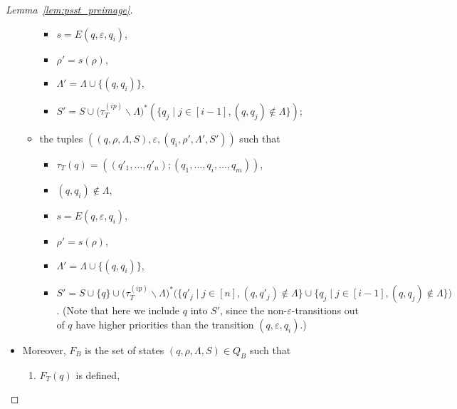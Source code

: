 \begin{proof}[Lemma~\ref{lem:psst_preimage}]
\begin{itemize}
\begin{itemize}
\begin{itemize}
\item $s = E(q, \varepsilon, q_i)$, 
%
\item $\rho' = s(\rho)$,
%
\item $\Lambda' = \Lambda \cup \{(q, q_i)\}$, 
%
\item $S' =  S \cup \big(\tau^{(ip)}_T \backslash \Lambda \big)^\ast(\{ q_j \mid j \in [i-1], (q, q_j) \not \in \Lambda \})$;
%
\end{itemize}
%

\item the tuples $((q, \rho, \Lambda, S), \varepsilon, (q_i, \rho', \Lambda', S'))$ such that 
\begin{itemize}
%
\item $\tau_T (q) = ((q'_1, \ldots, q'_n); (q_1, \ldots, q_i, \ldots, q_m))$, 
%
\item $(q, q_i) \not \in \Lambda$,
%
\item $s = E(q, \varepsilon, q_i)$,
%
\item $\rho' = s(\rho)$,
%
\item $\Lambda' = \Lambda \cup \{(q, q_i)\}$, 
%
\item $S' = S \cup \{q\} \cup \big(\tau^{(ip)}_T \backslash \Lambda \big)^\ast\big(\big\{q'_j \mid j \in [n], (q, q'_j) \not \in \Lambda \big\} \cup \big\{q_j \mid j \in [i-1], (q, q_j) \not \in \Lambda \big\} \big)$. (Note that here we include $q$ into $S'$, since the non-$\varepsilon$-transitions out of $q$ have higher priorities than the transition $(q, \varepsilon, q_i)$.)
%
\end{itemize}
\end{itemize}
\item
Moreover, $F_B$ is the set of states $(q, \rho, \Lambda, S) \in Q_B$ such that
\begin{enumerate}
  \item $F_T (q)$ is defined,

\end{enumerate}
\end{itemize}
\end{proof}
